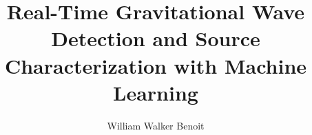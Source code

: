 

\phd %

%
\title{\bf Real-Time Gravitational Wave Detection and Source Characterization with Machine Learning}
\author{William Walker Benoit}


\abstract{}

\copyrightpage       %

\acknowledgements{}


\beforepreface

\figurespage
\tablespage

\afterpreface
